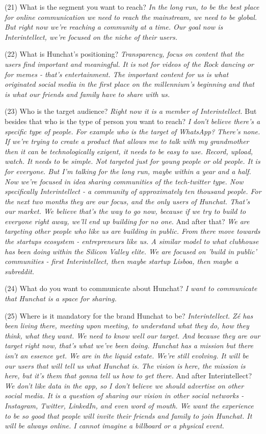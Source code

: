 \documentclass[12pt]{article}
\begin{document}
(21) What is the segment you want to reach? \textit{In the long run, to be the best place for online communication we need to reach the mainstream, we need to be global. But right now we're reaching a community at a time. Our goal now is Interintellect, we're focused on the niche of their users.}

(22) What is Hunchat’s positioning? \textit{Transparency, focus on content that the users find important and meaningful. It is not for videos of the Rock dancing or for memes - that's entertainment. The important content for us is what originated social media in the first place on the millennium's beginning and that is what our friends and family have to share with us.}

(23) Who is the target audience? \textit{Right now it is a member of Interintellect.} But besides that who is the type of person you want to reach? \textit{I don't believe there's a specific type of people. For example who is the target of WhatsApp? There's none. If we're trying to create a product that allows me to talk with my grandmother then it can be technologically exigent, it needs to be easy to use. Record, upload, watch. It needs to be simple. Not targeted just for young people or old people. It is for everyone. But I'm talking for the long run, maybe within a year and a half. Now we're focused in idea sharing communities of the tech-twitter type. Now specifically Interintellect - a community of approximately ten thousand people. For the next two months they are our focus, and the only users of Hunchat. That's our market. We believe that's the way to go now, because if we try to build to everyone right away, we'll end up building for no one.} And after that? \textit{We are targeting other people who like us are building in public. From there move towards the startups ecosystem - entrepreneurs like us. A similar model to what clubhouse has been doing within the Silicon Valley elite. We are focused on 'build in public' communities - first Interintellect, then maybe startup Lisboa, then maybe a subreddit.}

(24) What do you want to communicate about Hunchat? \textit{I want to communicate that Hunchat is a space for sharing.}

(25) Where is it mandatory for the brand Hunchat to be? \textit{Interintellect. Zé has been living there, meeting upon meeting, to understand what they do, how they think, what they want. We need to know well our target. And because they are our target right now, that's what we've been doing. Hunchat has a mission but there isn't an essence yet. We are in the liquid estate. We're still evolving. It will be our users that will tell us what Hunchat is. The vision is here, the mission is here, but it's them that gonna tell us how to get there.} And after Interintellect? \textit{We don't like data in the app, so I don't believe we should advertise on other social media. It is a question of sharing our vision in other social networks - Instagram, Twitter, LinkedIn, and even word of mouth. We want the experience to be so good that people will invite their friends and family to join Hunchat. It will be always online. I cannot imagine a billboard or a physical event.}
\end{document}
